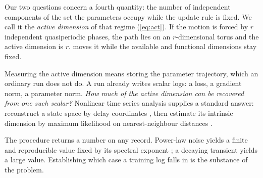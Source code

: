 \documentclass{article}
\begin{document}
Our two questions concern a fourth quantity: the number of independent components of the set the
parameters occupy while the update rule is fixed. We call it the \emph{active dimension} of that
regime (\cref{eq:act}). If the motion is forced by $r$ independent
quasiperiodic phases, the path lies on an $r$-dimensional torus and the active dimension is $r$.
 moves it while the available and functional dimensions stay fixed.

Measuring the active dimension means storing the parameter trajectory, which an ordinary run does
not do. A run already writes scalar logs: a loss, a gradient norm, a parameter norm.
\emph{How much of the active dimension can be recovered from one such scalar?} Nonlinear time
series analysis supplies a standard answer: reconstruct a state space by delay coordinates
\citep{takens1981detecting, sauer1991embedology}, then estimate its intrinsic dimension by maximum
likelihood on nearest-neighbour distances \citep{levina2004maximum, mackay2005comments}.

The procedure returns a number on any record. Power-law noise yields a finite and reproducible
value fixed by its spectral exponent \citep{osborne1989finite, theiler1991some}; a decaying
transient yields a large value. Establishing which case a training log falls in is the substance of
the problem.
\end{document}
